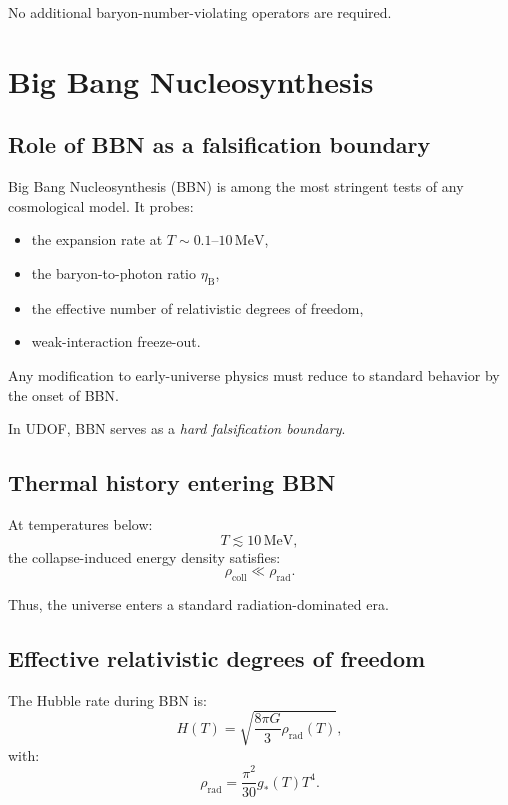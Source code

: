 \documentclass[11pt]{book}
\newcommand{\etaB}{\eta_{\mathrm{B}}}
\begin{document}
No additional baryon-number-violating operators are required.

\chapter{Big Bang Nucleosynthesis}

\section{Role of BBN as a falsification boundary}

Big Bang Nucleosynthesis (BBN) is among the most stringent tests of any
cosmological model. It probes:
\begin{itemize}
\item the expansion rate at $T \sim 0.1$--$10\,\mathrm{MeV}$,
\item the baryon-to-photon ratio $\etaB$,
\item the effective number of relativistic degrees of freedom,
\item weak-interaction freeze-out.
\end{itemize}

Any modification to early-universe physics must reduce to standard
behavior by the onset of BBN.

In UDOF, BBN serves as a \emph{hard falsification boundary}.

\section{Thermal history entering BBN}

At temperatures below:
\begin{equation}
T \lesssim 10\,\mathrm{MeV},
\end{equation}
the collapse-induced energy density satisfies:
\begin{equation}
\rho_{\mathrm{coll}} \ll \rho_{\mathrm{rad}}.
\end{equation}

Thus, the universe enters a standard radiation-dominated era.

\section{Effective relativistic degrees of freedom}

The Hubble rate during BBN is:
\begin{equation}
H(T) =
\sqrt{
\frac{8\pi G}{3}
\rho_{\mathrm{rad}}(T)
},
\end{equation}
with:
\begin{equation}
\rho_{\mathrm{rad}} =
\frac{\pi^2}{30}
g_\ast(T) T^4.
\end{equation}
\end{document}
